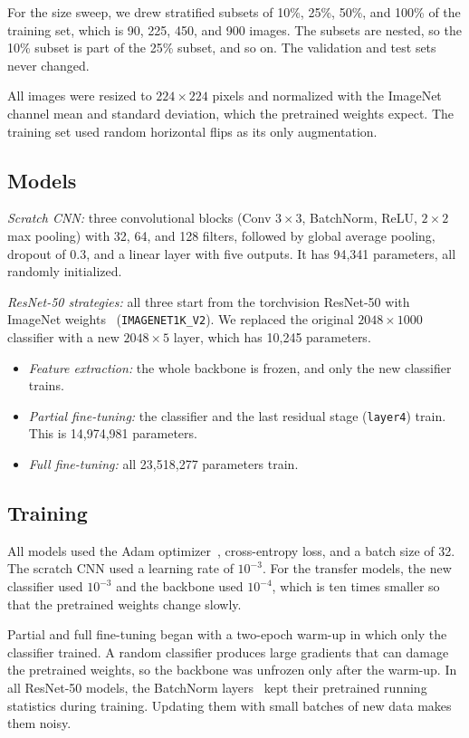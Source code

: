 \documentclass[journal]{IEEEtran}
\begin{document}
For the size sweep, we drew stratified subsets of 10\%, 25\%, 50\%, and 100\% of the training set, which is 90, 225, 450, and 900 images. The subsets are nested, so the 10\% subset is part of the 25\% subset, and so on. The validation and test sets never changed.

All images were resized to $224\times224$ pixels and normalized with the ImageNet channel mean and standard deviation, which the pretrained weights expect. The training set used random horizontal flips as its only augmentation.

\subsection{Models}
\textit{Scratch CNN:} three convolutional blocks (Conv $3\times3$, BatchNorm, ReLU, $2\times2$ max pooling) with 32, 64, and 128 filters, followed by global average pooling, dropout of 0.3, and a linear layer with five outputs. It has 94,341 parameters, all randomly initialized.

\textit{ResNet-50 strategies:} all three start from the torchvision ResNet-50 with ImageNet weights~\cite{he2016deep,deng2009imagenet} (\texttt{IMAGENET1K\_V2}). We replaced the original $2048\times1000$ classifier with a new $2048\times5$ layer, which has 10,245 parameters.
\begin{itemize}
\item \textit{Feature extraction:} the whole backbone is frozen, and only the new classifier trains.
\item \textit{Partial fine-tuning:} the classifier and the last residual stage (\texttt{layer4}) train. This is 14,974,981 parameters.
\item \textit{Full fine-tuning:} all 23,518,277 parameters train.
\end{itemize}

\subsection{Training}
All models used the Adam optimizer~\cite{kingma2015adam}, cross-entropy loss, and a batch size of 32. The scratch CNN used a learning rate of $10^{-3}$. For the transfer models, the new classifier used $10^{-3}$ and the backbone used $10^{-4}$, which is ten times smaller so that the pretrained weights change slowly.

Partial and full fine-tuning began with a two-epoch warm-up in which only the classifier trained. A random classifier produces large gradients that can damage the pretrained weights, so the backbone was unfrozen only after the warm-up. In all ResNet-50 models, the BatchNorm layers~\cite{ioffe2015batch} kept their pretrained running statistics during training. Updating them with small batches of new data makes them noisy.
\end{document}
